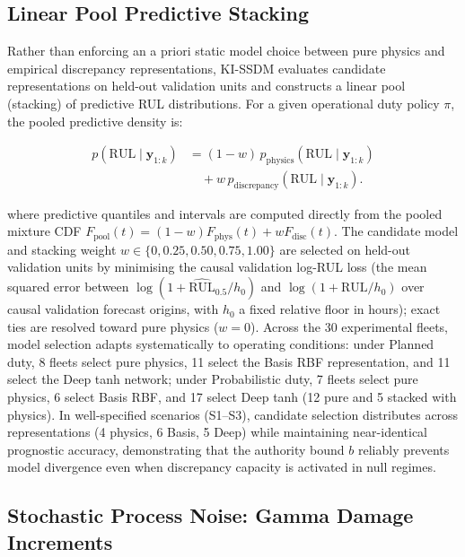 \documentclass[a4paper,fleqn]{cas-dc}
\newcommand{\RUL}{\mathrm{RUL}}
\begin{document}
\subsection{Linear Pool Predictive Stacking}
\label{subsec:linear_pool}

Rather than enforcing an a priori static model choice between pure physics and empirical discrepancy representations, KI-SSDM evaluates candidate representations on held-out validation units and constructs a linear pool (stacking) of predictive RUL distributions. For a given operational duty policy $\pi$, the pooled predictive density is:

\begin{equation}
\label{eq:linear_pool}
\begin{aligned}
p(\RUL \mid \mathbf{y}_{1:k})
&= (1-w)\,
p_{\mathrm{physics}}(\RUL \mid \mathbf{y}_{1:k})\\
&\quad + w\,
p_{\mathrm{discrepancy}}(
\RUL \mid \mathbf{y}_{1:k}).
\end{aligned}
\end{equation}

where predictive quantiles and intervals are computed directly from the pooled mixture CDF $F_{\mathrm{pool}}(t) = (1-w)F_{\mathrm{phys}}(t) + w F_{\mathrm{disc}}(t)$. The candidate model and stacking weight $w \in \{0, 0.25, 0.50, 0.75, 1.00\}$ are selected on held-out validation units by minimising the causal validation log-RUL loss (the mean squared error between $\log(1 + \widehat{\RUL}_{0.5}/h_0)$ and $\log(1 + \RUL/h_0)$ over causal validation forecast origins, with $h_0$ a fixed relative floor in hours); exact ties are resolved toward pure physics ($w = 0$). Across the 30 experimental fleets, model selection adapts systematically to operating conditions: under Planned duty, 8 fleets select pure physics, 11 select the Basis RBF representation, and 11 select the Deep tanh network; under Probabilistic duty, 7 fleets select pure physics, 6 select Basis RBF, and 17 select Deep tanh (12 pure and 5 stacked with physics). In well-specified scenarios (S1--S3), candidate selection distributes across representations (4 physics, 6 Basis, 5 Deep) while maintaining near-identical prognostic accuracy, demonstrating that the authority bound $b$ reliably prevents model divergence even when discrepancy capacity is activated in null regimes.

\subsection{Stochastic Process Noise: Gamma Damage Increments}
\label{subsec:gamma_noise}
\end{document}
